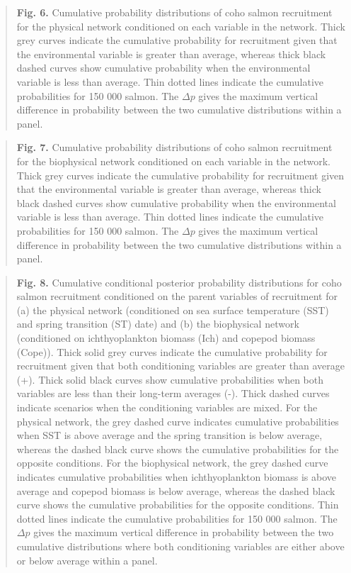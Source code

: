 \begin{quote}
\textbf{Fig. 6.} Cumulative probability distributions of coho salmon
recruitment for the physical network conditioned on each variable in the
network. Thick grey curves indicate the cumulative probability for
recruitment given that the environmental variable is greater than
average, whereas thick black dashed curves show cumulative probability
when the environmental variable is less than average. Thin dotted lines
indicate the cumulative probabilities for 150 000 salmon. The
\(\Delta p\) gives the maximum vertical difference in probability
between the two cumulative distributions within a panel.
\end{quote}

\begin{quote}
\textbf{Fig. 7.} Cumulative probability distributions of coho salmon
recruitment for the biophysical network conditioned on each variable in
the network. Thick grey curves indicate the cumulative probability for
recruitment given that the environmental variable is greater than
average, whereas thick black dashed curves show cumulative probability
when the environmental variable is less than average. Thin dotted lines
indicate the cumulative probabilities for 150 000 salmon. The
\(\Delta p\) gives the maximum vertical difference in probability
between the two cumulative distributions within a panel.
\end{quote}

\begin{quote}
\textbf{Fig. 8.} Cumulative conditional posterior probability
distributions for coho salmon recruitment conditioned on the parent
variables of recruitment for (a) the physical network (conditioned on
sea surface temperature (SST) and spring transition (ST) date) and (b)
the biophysical network (conditioned on ichthyoplankton biomass (Ich)
and copepod biomass (Cope)). Thick solid grey curves indicate the
cumulative probability for recruitment given that both conditioning
variables are greater than average (+). Thick solid black curves show
cumulative probabilities when both variables are less than their
long-term averages (-). Thick dashed curves indicate scenarios when the
conditioning variables are mixed. For the physical network, the grey
dashed curve indicates cumulative probabilities when SST is above
average and the spring transition is below average, whereas the dashed
black curve shows the cumulative probabilities for the opposite
conditions. For the biophysical network, the grey dashed curve indicates
cumulative probabilities when ichthyoplankton biomass is above average
and copepod biomass is below average, whereas the dashed black curve
shows the cumulative probabilities for the opposite conditions. Thin
dotted lines indicate the cumulative probabilities for 150 000 salmon.
The \(\Delta p\) gives the maximum vertical difference in probability
between the two cumulative distributions where both conditioning
variables are either above or below average within a panel.
\end{quote}

